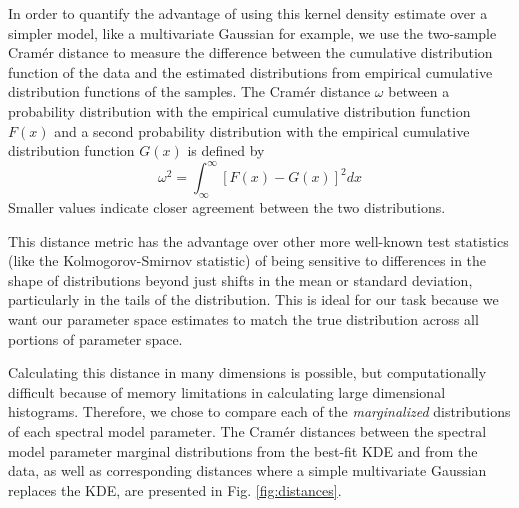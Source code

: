 In order to quantify the advantage of using this kernel density estimate over a simpler model, like a multivariate Gaussian for example, we use the two-sample Cram\'{e}r distance \parencite{Cramer1928} to measure the difference between the cumulative distribution function of the data and the estimated distributions from empirical cumulative distribution functions of the samples.
The Cram\'{e}r distance $\omega$ between a probability distribution with the empirical cumulative distribution function $F(x)$ and a second probability distribution with the empirical cumulative distribution function $G(x)$ is defined by
\begin{equation}
    \omega^2 = \displaystyle \int_\infty^\infty [F(x)-G(x)]^2 dx
\end{equation}
Smaller values indicate closer agreement between the two distributions.

This distance metric has the advantage over other more well-known test statistics (like the Kolmogorov-Smirnov statistic) of being sensitive to differences in the shape of distributions beyond just shifts in the mean or standard deviation, particularly in the tails of the distribution. This is ideal for our task because we want our parameter space estimates to match the true distribution across all portions of parameter space.

Calculating this distance in many dimensions is possible, but computationally difficult because of memory limitations in calculating large dimensional histograms. Therefore, we chose to compare each of the \emph{marginalized} distributions of each spectral model parameter. The Cram\'{e}r distances between the spectral model parameter marginal distributions from the best-fit KDE and from the data, as well as corresponding distances where a simple multivariate Gaussian replaces the KDE, are presented in Fig. \ref{fig:distances}.

